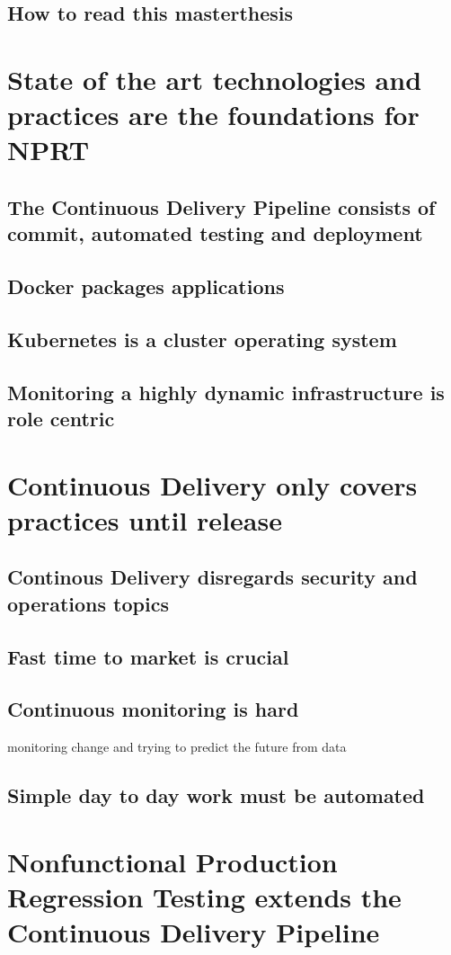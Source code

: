\section{How to read this masterthesis}

\chapter{State of the art technologies and practices are the foundations for NPRT}
\section{The Continuous Delivery Pipeline consists of commit, automated testing and deployment}
\section{Docker packages applications}
\section{Kubernetes is a cluster operating system}
\section{Monitoring a highly dynamic infrastructure is role centric}

\chapter{Continuous Delivery only covers practices until release}
\section{Continous Delivery disregards security and operations topics}
\section{Fast time to market is crucial}
\section{Continuous monitoring is hard}
monitoring change and trying to predict the future from data
\section{Simple day to day work must be automated}

\chapter{Nonfunctional Production Regression Testing extends the Continuous Delivery Pipeline}
